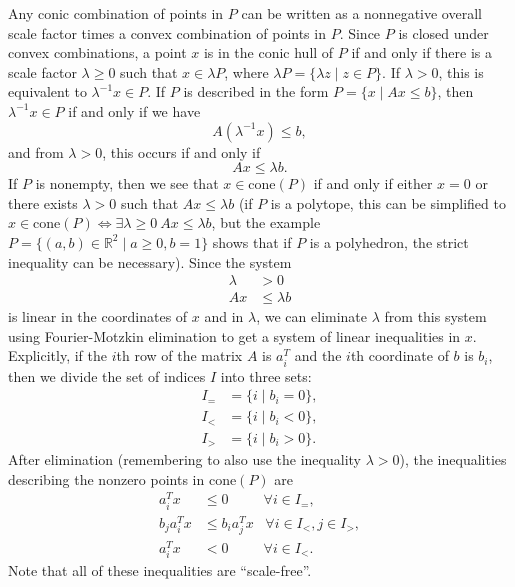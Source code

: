 \documentclass[12pt]{article}
\begin{document}
\begin{enumerate}
Any conic combination of points in $P$ can be written as a nonnegative overall scale factor times a convex combination of points in $P$. Since $P$ is closed under convex combinations, a point $x$ is in the conic hull of $P$ if and only if there is a scale factor $\lambda \ge 0$ such that $x \in \lambda P$, where $\lambda P = \{\lambda z \mid z \in P\}$. If $\lambda > 0$, this is equivalent to $\lambda^{-1}x \in P$. If $P$ is described in the form $P = \{x \mid Ax \le b\}$, then $\lambda^{-1}x \in P$ if and only if we have
\[
A(\lambda^{-1}x) \le b,
\]
and from $\lambda > 0$, this occurs if and only if
\[
Ax \le \lambda b.
\]
If $P$ is nonempty, then we see that $x \in \text{cone}(P)$ if and only if either $x = 0$ or there exists $\lambda > 0$ such that $Ax \le \lambda b$ (if $P$ is a polytope, this can be simplified to $x \in \text{cone}(P) \iff \exists \lambda \ge 0\ Ax \le \lambda b$, but the example $P = \{(a,b) \in \mathbb{R}^2 \mid a \ge 0, b = 1\}$ shows that if $P$ is a polyhedron, the strict inequality can be necessary). Since the system
\begin{align*}
\lambda &> 0\\
Ax &\le \lambda b
\end{align*}
is linear in the coordinates of $x$ and in $\lambda$, we can eliminate $\lambda$ from this system using Fourier-Motzkin elimination to get a system of linear inequalities in $x$. Explicitly, if the $i$th row of the matrix $A$ is $a_i^T$ and the $i$th coordinate of $b$ is $b_i$, then we divide the set of indices $I$ into three sets:
\begin{align*}
I_= &= \{i \mid b_i = 0\},\\
I_< &= \{i \mid b_i < 0\},\\
I_> &= \{i \mid b_i > 0\}.
\end{align*}
After elimination (remembering to also use the inequality $\lambda > 0$), the inequalities describing the nonzero points in $\text{cone}(P)$ are
\begin{align*}
a_i^T x &\le 0 \;\;\;\;\;\;\;\;\; \forall i \in I_=,\\
b_j a_i^Tx &\le b_i a_j^T x \;\;\; \forall i \in I_<, j \in I_>,\\
a_i^T x &< 0 \;\;\;\;\;\;\;\;\; \forall i \in I_<.
\end{align*}
Note that all of these inequalities are ``scale-free''.




\end{enumerate}
\end{document}
